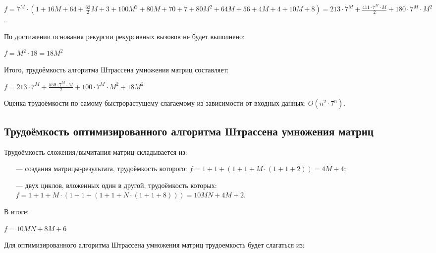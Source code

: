 $f = 7^M \cdot (1 + 16M+64 + \frac{63}{2}M + 3 + 100M^2 + 80M + 70 + 7 + 80M^2 + 64M + 56 + 4M+4 + 10M+8) = 213 \cdot 7^M + \frac{411 \cdot 7^M \cdot M}{2} + 180 \cdot 7^M \cdot M^2$.

По достижении основания рекурсии рекурсивных вызовов не будет выполнено:

$f = M^2 \cdot 18 = 18M^2$ 

Итого, трудоёмкость алгоритма Штрассена умножения матриц составляет:

$f = 213 \cdot 7^M + \frac{559 \cdot 7^M \cdot M}{2} + 100 \cdot 7^M \cdot M^2 + 18M^2$

Оценка трудоёмкости по самому быстрорастущему слагаемому из зависимости от входных данных: $O(n^2 \cdot 7^n)$.

\subsection{Трудоёмкость оптимизированного алгоритма Штрассена умножения матриц}

Трудоёмкость сложения/вычитания матриц складывается из:
\begin{itemize}
	\item[---] создания матрицы-результата, трудоёмкость которого: $f = 1 + 1 + (1 + 1 + M \cdot (1 + 1 + 2)) = 4M+4$;
	\item[---] двух циклов, вложенных один в другой, трудоёмкость которых: $f = 1 + 1 + M \cdot (1 + 1 + (1 + 1 + N \cdot (1 + 1 + 8))) = 10MN + 4M + 2$.
\end{itemize}

В итоге:

$f = 10MN + 8M + 6$

Для оптимизированного алгоритма Штрассена умножения матриц трудоемкость будет слагаться из:

